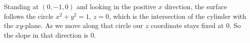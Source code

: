 \begin{solution}
Standing at $(0,-1,0)$ and looking in the positive $x$ direction, 
the surface follows the circle $x^2+y^2=1$, $z=0$, which is the intersection 
of the cylinder with the $xy$-plane. As we move along that circle our $z$ coordinate stays fixed at $0$. So the slope in that direction is 0.


\end{solution}
  

